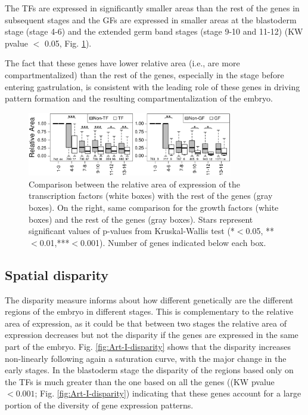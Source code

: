 The TFs are expressed in significantly smaller areas than the rest of the genes in subsequent stages and the GFs are expressed in smaller areas at the blastoderm stage (stage 4-6) and the extended germ band stages (stage 9-10 and 11-12) (KW pvalue $<$ 0.05, Fig. \ref{fig:Art-I-TF-GF_area}).

 The fact that these genes have lower relative area (i.e., are more compartmentalized) than the rest of the genes, especially in the stage before entering gastrulation, is consistent with the leading role of these genes in driving pattern formation and the resulting compartmentalization of the embryo.
 
\begin{figure}[h]
  \includegraphics[width=0.8\textwidth]{./Images/Art-I/TF-GF_area.png}
  \centering
  \caption{Comparison between the relative area of expression of the transcription factors (white boxes) with the rest of the genes (gray boxes). On the right, same comparison for the growth factors (white boxes) and the rest of the genes (gray boxes). Stars represent significant values of p-values from Kruskal-Wallis test (*$<$0.05, **$<$0.01,***$<$0.001). Number of genes indicated below each box. }
  \label{fig:Art-I-TF-GF_area}
\end{figure}

\subsection{Spatial disparity}

The disparity measure informs about how different genetically are the different regions of the embryo in different stages. This is complementary to the relative area of expression, as it could be that between two stages the relative area of expression decreases but not the disparity if the genes are expressed in the same part of the embryo.
Fig. \ref{fig:Art-I-disparity} shows that the disparity increases non-linearly following again a saturation curve, with the major change in the early stages.
In the blastoderm stage the disparity of the regions based only on the TFs is much greater than the one based on all the genes ((KW pvalue $<0.001$; Fig. \ref{fig:Art-I-disparity}) indicating that these genes account for a large portion of the diversity of gene expression patterns.


